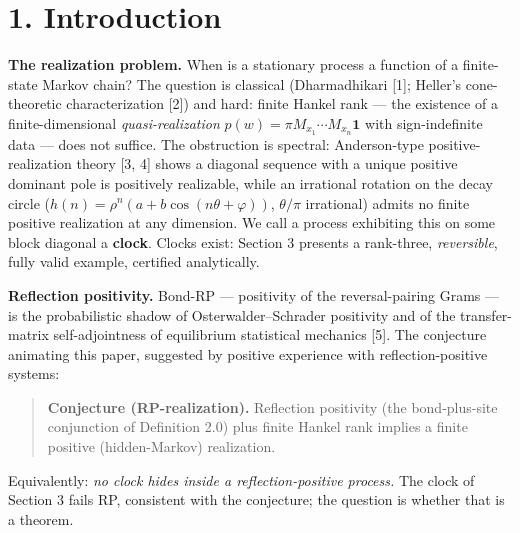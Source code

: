 \documentclass[11pt]{article}
\begin{document}
\section*{1. Introduction}
\textbf{The realization problem.}  When is a stationary process a function of a finite-state Markov chain?  The question is classical (Dharmadhikari [1]; Heller's cone-theoretic characterization [2]) and hard: finite Hankel rank — the existence of a finite-dimensional \emph{quasi-realization} $p(w) = \pi M_{x_1}\cdots M_{x_n}\mathbf 1$ with sign-indefinite data — does not suffice.  The obstruction is spectral: Anderson-type positive-realization theory [3, 4] shows a diagonal sequence with a unique positive dominant pole is positively realizable, while an irrational rotation on the decay circle ($h(n) = \rho^n(a + b\cos(n\theta + \varphi))$, $\theta/\pi$ irrational) admits no finite positive realization at any dimension. We call a process exhibiting this on some block diagonal a \textbf{clock}.  Clocks exist: Section 3 presents a rank-three, \emph{reversible}, fully valid example, certified analytically.

\textbf{Reflection positivity.}  Bond-RP — positivity of the reversal-pairing Grams — is the probabilistic shadow of Osterwalder–Schrader positivity and of the transfer-matrix self-adjointness of equilibrium statistical mechanics [5].  The conjecture animating this paper, suggested by positive experience with reflection-positive systems:

\begin{quote}
\textbf{Conjecture (RP-realization).}  Reflection positivity (the bond-plus-site conjunction of Definition 2.0) plus finite Hankel rank implies a finite positive (hidden-Markov) realization.
\end{quote}
Equivalently: \emph{no clock hides inside a reflection-positive process.} The clock of Section 3 fails RP, consistent with the conjecture; the question is whether that is a theorem.
\end{document}
